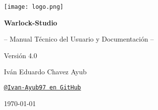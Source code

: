 \documentclass[11pt, a4paper]{article}
\begin{document}
\begin{titlepage}
    \begin{tcolorbox}[
        colback=WarlockDark,                    %
        colframe=WarlockGold,                   %
        sharp corners,                          %
        boxrule=1.5pt,                          %
        halign=center,                          %
        valign=center,                          %
        height=\dimexpr\textheight-1cm\relax    %
      ]
      \centering %

      \texttt{[image: logo.png]}\par %

      \vfill %

      \color{white} %

      {\Huge\bfseries Warlock-Studio\par}
      \vspace{0.7cm} %
      {\Large -- Manual Técnico del Usuario y Documentación --\par}
      \vspace{0.2cm}
      {\Large Versión 4.0\par}

      \vfill %

      {\large Iván Eduardo Chavez Ayub\par}
      \href{https://github.com/Ivan-Ayub97}{\texttt{\color{WarlockGold}@Ivan-Ayub97 en GitHub}}\par %

      \vspace{1.5cm}

      {\large \today\par} %
    \end{tcolorbox}
    \thispagestyle{empty} %
\end{titlepage}
\end{document}
